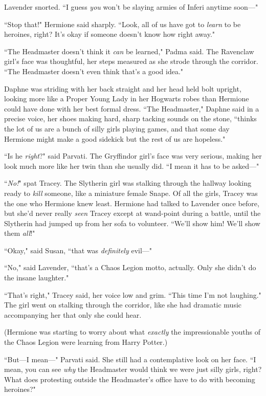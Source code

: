 Lavender snorted. ``I guess \emph{you} won't be slaying armies of Inferi anytime soon---"

``Stop that!" Hermione said sharply. ``Look, all of us have got to \emph{learn} to be heroines, right? It's okay if someone doesn't know how right away."

``The Headmaster doesn't think it \emph{can} be learned," Padma said. The Ravenclaw girl's face was thoughtful, her steps measured as she strode through the corridor. ``The Headmaster doesn't even think that's a good idea."

Daphne was striding with her back straight and her head held bolt upright, looking more like a Proper Young Lady in her Hogwarts robes than Hermione could have done with her best formal dress. ``The Headmaster," Daphne said in a precise voice, her shoes making hard, sharp tacking sounds on the stone, ``thinks the lot of us are a bunch of silly girls playing games, and that some day Hermione might make a good sidekick but the rest of us are hopeless."

``Is he \emph{right}?" said Parvati. The Gryffindor girl's face was very serious, making her look much more like her twin than she usually did. ``I mean it has to be asked---"

``\emph{No!}" spat Tracey. The Slytherin girl was stalking through the hallway looking ready to \emph{kill} someone, like a miniature female Snape. Of all the girls, Tracey was the one who Hermione knew least. Hermione had talked to Lavender once before, but she'd never really \emph{seen} Tracey except at wand-point during a battle, until the Slytherin had jumped up from her sofa to volunteer. ``We'll show him! We'll show them \emph{all}!"

``Okay," said Susan, ``that was \emph{definitely} evil---"

``No," said Lavender, ``that's a Chaos Legion motto, actually. Only she didn't do the insane laughter."

``That's right," Tracey said, her voice low and grim. ``This time I'm not laughing." The girl went on stalking through the corridor, like she had dramatic music accompanying her that only she could hear.

(Hermione was starting to worry about what \emph{exactly} the impressionable youths of the Chaos Legion were learning from Harry Potter.)

``But---I mean---" Parvati said. She still had a contemplative look on her face. ``I mean, you can see \emph{why} the Headmaster would think we were just silly girls, right? What does protesting outside the Headmaster's office have to do with becoming heroines?"

